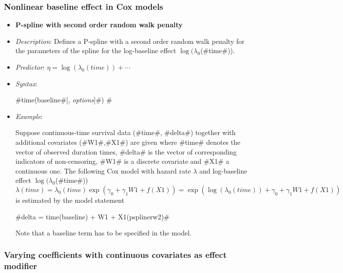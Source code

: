 \subsubsection*{Nonlinear baseline effect in Cox models}

\begin{itemize}
\item[]{\bf\sffamily P-spline with second order random walk
penalty}

\item[] {\em Description}: Defines a P-spline with a second order
random walk penalty for the parameters of the spline for the
log-baseline effect $\log(\lambda_0$(#time#)). \item[] {\em
Predictor}: $\eta = \log(\lambda_0(time)) + \cdots$ \item[] {\em
Syntax}:

#time(baseline#[, {\em options}]#) #
\item[] {\em Example}:

Suppose continuous-time survival data (#time#, #delta#) together
with additional covariates (#W1#,#X1#) are given where #time#
denotes the vector of observed duration times, #delta# is the
vector of corresponding indicators of non-censoring, #W1# is a
discrete covariate and #X1# a continuous one. The following Cox
model with hazard rate $\lambda$ and log-baseline effect
$\log(\lambda_0$(#time#))
\[
\lambda(time)=\lambda_0(time)\exp (\gamma_0 + \gamma_1 W1 + f(X1)
)=\exp\left(\log(\lambda_0(time)) + \gamma_0 + \gamma_1 W1 +
f(X1)\right)
\]
is estimated by the model statement

#delta = time(baseline) + W1 + X1(psplinerw2)#

Note that a baseline term has to be specified in the model.
\end{itemize}

\subsubsection*{Varying coefficients with continuous covariates as
effect modifier}
\medskip

